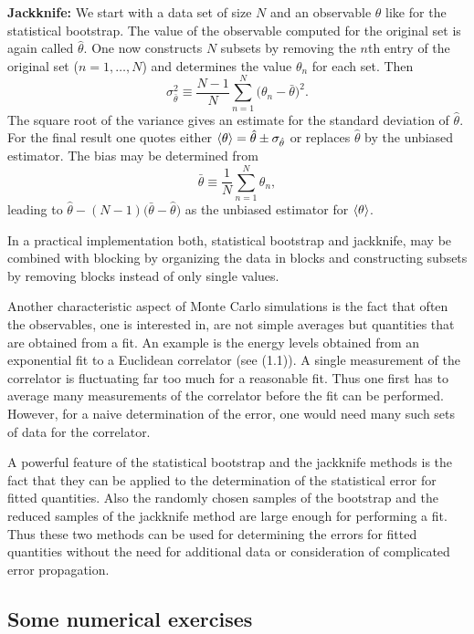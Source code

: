 \textbf{Jackknife:} We start with a data set of size $N$ and an observable $\theta$ like for
the statistical bootstrap. The value of the observable computed for the
original set is again called $\hat{\theta}$. One now constructs $N$ subsets by removing
the $n$th entry of the original set ($n = 1, \ldots, N$) and determines the value
$\theta_n$ for each set. Then
\begin{equation}
  \sigma_{\bar{\theta}}^2 \equiv \frac{N-1}{N}\sum_{n=1}^{N}\big(\theta_n - \bar{\theta}\big)^2 .
\end{equation}
The square root of the variance gives an estimate for the standard deviation of $\hat{\theta}$. For the final result one quotes either $\left\langle \theta \right\rangle = \hat{\theta} \pm \sigma_{\hat{\theta}}$ or replaces $\hat{\theta}$
by the unbiased estimator. The bias may be determined from
\begin{equation}
  \bar{\theta} \equiv \frac{1}{N}\sum_{n=1}^{N}\theta_n,
\end{equation}
leading to $\hat{\theta} - (N-1)\big(\bar{\theta} - \hat{\theta}\big)$ as the unbiased estimator for $\left\langle \theta \right\rangle$.

In a practical implementation both, statistical bootstrap and jackknife, may
be combined with blocking by organizing the data in blocks and constructing
subsets by removing blocks instead of only single values.

Another characteristic aspect of Monte Carlo simulations is the fact that
often the observables, one is interested in, are not simple averages but quantities that are obtained from a fit. An example is the energy levels obtained
from an exponential fit to a Euclidean correlator (see (1.1)). A single measurement of the correlator is fluctuating far too much for a reasonable fit. Thus
one first has to average many measurements of the correlator before the fit
can be performed. However, for a naive determination of the error, one would
need many such sets of data for the correlator.

A powerful feature of the statistical bootstrap and the jackknife methods
is the fact that they can be applied to the determination of the statistical error
for fitted quantities. Also the randomly chosen samples of the bootstrap and
the reduced samples of the jackknife method are large enough for performing
a fit. Thus these two methods can be used for determining the errors for fitted
quantities without the need for additional data or consideration of complicated
error propagation.

\subsection{Some numerical exercises}

